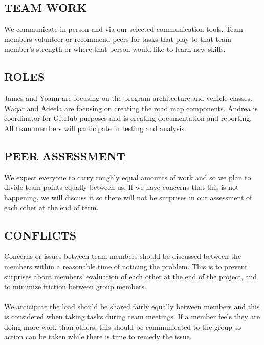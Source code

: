 \documentclass[11pt]{article}
\begin{document}
\subsection*{TEAM WORK}

We communicate in person and via our selected communication tools.  Team members 
volunteer or recommend peers for tasks that play to that team member's strength or where 
that person would like to learn new skills.


\subsection*{ROLES}

James and Yoann are focusing on the program architecture and vehicle classes. Waqar and 
Adeela are focusing on creating the road map components. Andrea is coordinator for GitHub 
purposes and is creating documentation and reporting. All team members will participate 
in testing and analysis.


\subsection*{PEER ASSESSMENT}

We expect everyone to carry roughly equal amounts of work and so we plan to divide team 
points equally between us. If we have concerns that this is not happening, we will 
discuss it so there will not be surprises in our assessment of each other at the end of term.


\subsection*{CONFLICTS}

Concerns or issues between team members should be discussed between the members within 
a reasonable time of noticing the problem. This is to prevent surprises about members' 
evaluation of each other at the end of the project, and to minimize friction between 
group members.
\\ \\
We anticipate the load should be shared fairly equally between members and 
this is considered when taking tasks during team meetings. If a member feels 
they are doing more work than others, this should be communicated to the group so action 
can be taken while there is time to remedy the issue.
\end{document}
